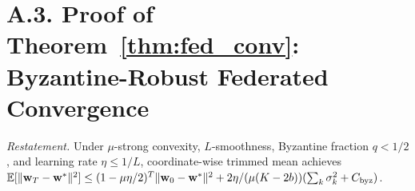 \section*{A.3. Proof of Theorem~\ref{thm:fed_conv}: Byzantine-Robust Federated Convergence}
\label{app:proof_fed}

\noindent\textit{Restatement.} Under $\mu$-strong convexity, $L$-smoothness, Byzantine fraction $q<1/2$, and learning rate $\eta\le 1/L$, coordinate-wise trimmed mean achieves $\mathbb{E}[\|\mathbf{w}_T-\mathbf{w}^*\|^2]\le(1-\mu\eta/2)^T\|\mathbf{w}_0-\mathbf{w}^*\|^2 + 2\eta/(\mu(K-2b))(\sum_k\sigma_k^2 + C_{\mathrm{byz}})$.

